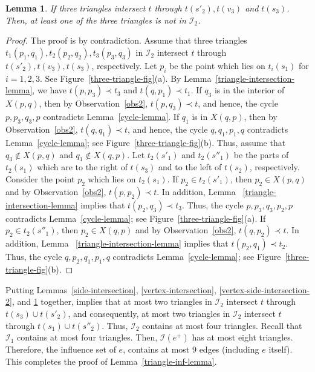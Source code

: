 \documentclass[11pt,a4paper]{article}
\newcommand{\trmin}{t}
\newcommand{\hex}[2]{X(#1,#2)}
\newcommand{\tra}[2]{{#1}({#2})}
\newtheorem{lemma}{Lemma}
\begin{document}
\begin{lemma}
\label{vertex-side-intersection-1}
If three triangles intersect $\trmin$ through $\tra{\trmin}{s'_2}, \tra{\trmin}{v_3}$ and $\tra{\trmin}{s_3}$. Then, at least one of the three triangles is not in $\mathcal{I}_2$. 
\end{lemma}
\begin{proof}
The proof is by contradiction. Assume that three triangles $t_1(p_1,q_1), t_2(p_2,q_2),t_3(p_3,q_3)$ in $\mathcal{I}_2$ intersect $\trmin$ through $\tra{\trmin}{s'_2}, \tra{\trmin}{v_3}, \tra{\trmin}{s_3}$, respectively. Let $p_i$ be the point which lies on $t_i(s_1)$ for $i=1,2,3$. See Figure~\ref{three-triangle-fig}(a). By Lemma~\ref{triangle-intersection-lemma}, we have $t(p,p_3)\prec t_3$ and $t(q,p_1)\prec t_1$. If $q_3$ is in the interior of $\hex{p}{q}$, then by Observation~\ref{obs2}, $t(p,q_3)\prec t$, and hence, the cycle $p,p_3,q_3,p$ contradicts Lemma~\ref{cycle-lemma}. If $q_1$ is in $\hex{q}{p}$, then by Observation~\ref{obs2}, $t(q,q_1)\prec t$, and hence, the cycle $q,q_1,p_1,q$ contradicts Lemma~\ref{cycle-lemma}; see Figure~\ref{three-triangle-fig}(b). Thus, assume that $q_3\notin \hex{p}{q}$ and $q_1\notin \hex{q}{p}$. Let $\tra{t_2}{s'_1}$ and $\tra{t_2}{s''_1}$ be the parts of $\tra{t_2}{s_1}$ which are to the right of $t(s_3)$ and to the left of $t(s_2)$, respectively. Consider the point $p_2$ which lies on $\tra{t_2}{s_1}$. 
If $p_2\in\tra{t_2}{s'_1}$, then $p_2\in \hex{p}{q}$ and by Observation~\ref{obs2}, $t(p,p_2)\prec t$. In addition, Lemma ~\ref{triangle-intersection-lemma} implies that $t(p_2,q_3)\prec t_3$. Thus, the cycle $p,p_3,q_3,p_2,p$ contradicts Lemma~\ref{cycle-lemma}; see Figure~\ref{three-triangle-fig}(a).
If $p_2\in\tra{t_2}{s''_1}$, then $p_2\in \hex{q}{p}$ and by Observation~\ref{obs2}, $t(q,p_2)\prec t$. In addition, Lemma ~\ref{triangle-intersection-lemma} implies that $t(p_2,q_1)\prec t_2$. Thus, the cycle $q,p_2,q_1,p_1,q$ contradicts Lemma~\ref{cycle-lemma}; see Figure~\ref{three-triangle-fig}(b).
\end{proof}



Putting Lemmas~\ref{side-intersection}, \ref{vertex-intersection}, \ref{vertex-side-intersection-2}, and \ref{vertex-side-intersection-1} together, implies that at most two triangles in $\mathcal{I}_2$ intersect $t$ through $t(s_3)\cup t(s'_2)$,  and consequently, at most two triangles in $\mathcal{I}_2$ intersect $t$ through $t(s_1)\cup t(s''_2)$. Thus, $\mathcal{I}_2$ contains at most four triangles. Recall that $\mathcal{I}_1$ contains at most four triangles. Then, $\mathcal{I}(e^+)$ has at most eight triangles. Therefore, the influence set of $e$, contains at most 9 edges (including $e$ itself). This completes the proof of Lemma~\ref{triangle-inf-lemma}. 
\end{document}
